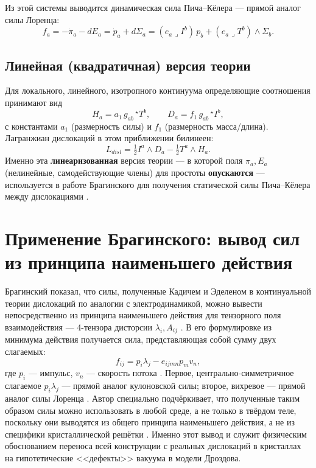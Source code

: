 \documentclass[12pt,a4paper]{article}
\begin{document}
Из этой системы выводится динамическая сила Пича--Кёлера --- прямой
аналог силы Лоренца:
\begin{equation}
f_a = -\dot\pi_a - dE_a = \dot p_a + d\Sigma_a
= (e_a\lrcorner I^b)\,p_b + (e_a\lrcorner T^b)\wedge \Sigma_b.
\end{equation}

\subsection{Линейная (квадратичная) версия теории}

Для локального, линейного, изотропного континуума определяющие
соотношения принимают вид
\begin{equation}
H_a = a_1\,g_{ab}\,{}^\star T^b,\qquad D_a = f_1\,g_{ab}\,{}^\star I^b,
\end{equation}
с константами $a_1$ (размерность силы) и $f_1$ (размерность
масса/длина). Лагранжиан дислокаций в этом приближении билинеен:
\begin{equation}
L_{disl}=\tfrac12 I^a\wedge D_a - \tfrac12 T^a\wedge H_a.
\end{equation}
Именно эта \textbf{линеаризованная} версия теории --- в которой поля
$\pi_a,E_a$ (нелинейные, самодействующие члены) для простоты
\textbf{опускаются} --- используется в работе Брагинского для
получения статической силы Пича--Кёлера между дислокациями
\cite{Braginsky2018,Braginsky2016}.

\section{Применение Брагинского: вывод сил из принципа наименьшего действия}
\label{sec:braginsky}

Брагинский показал, что силы, полученные Кадичем и Эделеном в
континуальной теории дислокаций по аналогии с электродинамикой, можно
вывести непосредственно из принципа наименьшего действия для тензорного
поля взаимодействия --- 4-тензора дисторсии $\lambda_i,A_{ij}$
\cite{Braginsky2018}. В его формулировке из минимума действия
получается сила, представляющая собой сумму двух слагаемых:
\begin{equation}
f_{ij}=p_i\lambda_j - e_{ijmn}p_mv_n,
\end{equation}
где $p_i$ --- импульс, $v_n$ --- скорость потока \cite{Braginsky2018}.
Первое, центрально-симметричное слагаемое $p_i\lambda_j$ --- прямой
аналог кулоновской силы; второе, вихревое --- прямой аналог силы
Лоренца \cite{Braginsky2018}. Автор специально подчёркивает, что
полученные таким образом силы можно использовать в любой среде, а не
только в твёрдом теле, поскольку они выводятся из общего принципа
наименьшего действия, а не из специфики кристаллической решётки
\cite{Braginsky2018}. Именно этот вывод и служит физическим
обоснованием переноса всей конструкции с реальных дислокаций в
кристаллах на гипотетические <<дефекты>> вакуума в модели Дроздова.
\end{document}
